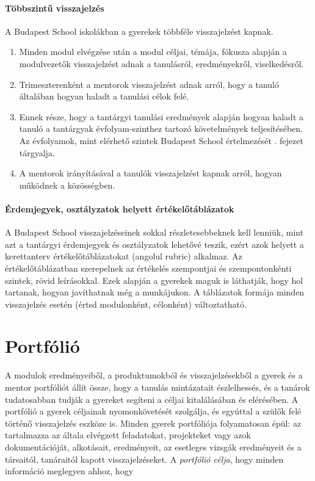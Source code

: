 \paragraph{Többszintű visszajelzés} A Budapest School iskolákban a gyerekek
többféle visszajelzést kapnak. \begin{enumerate}
      \item Minden modul elvégzése után a modul céljai, témája, fókusza alapján
            a
            modulvezetők visszajelzést adnak a tanulásról, eredményekről,
            viselkedésről.
      \item Trimeszterenként a mentorok visszajelzést adnak arról, hogy a
            tanuló
            általában hogyan haladt a tanulási célok felé.
      \item Ennek része, hogy a tantárgyi tanulási eredmények alapján hogyan
            haladt a
            tanuló a tantárgyak évfolyam-szinthez tartozó követelmények
            teljesítésében. Az
            évfolyamok, mint elérhető szintek Budapest School értelmezését
            . fejezet tárgyalja.
      \item A mentorok irányításával a tanulók visszajelzést kapnak arról,
            hogyan
            működnek a közösségben.
\end{enumerate}

\paragraph{Érdemjegyek, osztályzatok helyett értékelőtáblázatok} A Budapest
School visszajelzéseinek sokkal részletesebbeknek kell lenniük, mint azt a
tantárgyi érdemjegyek és osztályzatok lehetővé teszik, ezért azok helyett a
kerettanterv
értékelőtáblázatokat (angolul rubric) alkalmaz. Az értékelőtáblázatban
szerepelnek az értékelés szempontjai és szempontonkénti szintek, rövid
leírásokkal.
Ezek alapján a gyerekek maguk is láthatják, hogy hol tartanak, hogyan
javíthatnak még a munkájukon. A táblázatok formája minden visszajelzés esetén
(értsd modulonként, célonként)
változtatható.

\section{Portfólió}
\label{sec:portfolio}
A modulok eredményeiből, a produktumokból és visszajelzésekből a gyerek és a
mentor portfóliót
állít össze, hogy a tanulás mintázatait észlelhessés, és a
tanárok tudatosabban tudják
a gyereket segíteni a céljai kitalálásában és elérésében. A portfólió a gyerek
céljainak nyomonkövetését szolgálja, és egyúttal a szülők felé történő
visszajelzés eszköze
is. Minden gyerek portfóliója folyamatosan épül: az tartalmazza az általa
elvégzett feladatokat, projekteket vagy azok dokumentációját, alkotásait,
eredményeit, az esetleges vizsgák eredményeit és a társaitól, tanáraitól kapott
visszajelzéseket. A \emph{portfólió célja}, hogy minden információ meglegyen
ahhoz,
hogy


